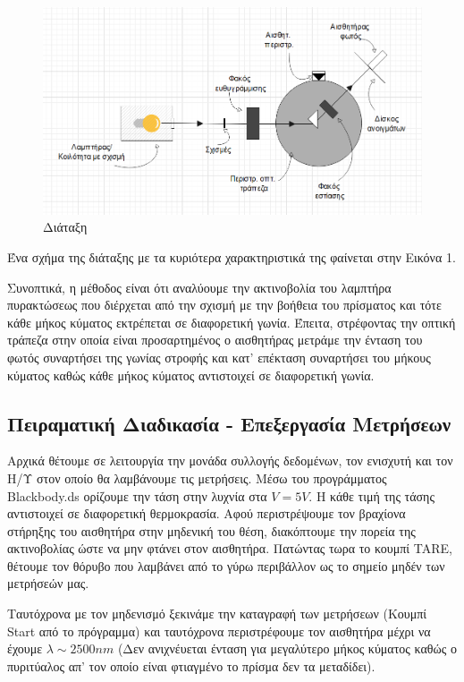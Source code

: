 \documentclass[a4paper]{article}
\begin{document}
\begin{figure}
\includegraphics[width=1.3\linewidth]{setup.png} 
\caption{Διάταξη}
\label{fig:wrapfig}
\end{figure}
	
Ένα σχήμα της διάταξης με τα κυριότερα χαρακτηριστικά της φαίνεται στην Εικόνα 1.

Συνοπτικά, η μέθοδος είναι ότι αναλύουμε την ακτινοβολία του λαμπτήρα πυρακτώσεως που διέρχεται από την σχισμή με την βοήθεια του πρίσματος και τότε κάθε μήκος κύματος εκτρέπεται σε διαφορετική γωνία. Έπειτα, στρέφοντας την οπτική τράπεζα στην οποία είναι προσαρτημένος ο αισθητήρας μετράμε  την ένταση του φωτός συναρτήσει της γωνίας στροφής και κατ' επέκταση συναρτήσει του μήκους κύματος καθώς κάθε μήκος κύματος αντιστοιχεί σε διαφορετική γωνία.


\subsection*{Πειραματική Διαδικασία - Επεξεργασία Μετρήσεων}
Αρχικά θέτουμε σε λειτουργία την μονάδα συλλογής δεδομένων, τον ενισχυτή και τον Η/Υ στον οποίο θα λαμβάνουμε τις μετρήσεις. Μέσω του προγράμματος Blackbody.ds ορίζουμε την τάση στην λυχνία στα $V=5V$. Η κάθε τιμή της τάσης αντιστοιχεί σε διαφορετική θερμοκρασία. Αφού περιστρέψουμε τον βραχίονα στήρηξης του αισθητήρα στην μηδενική του θέση, διακόπτουμε την πορεία της ακτινοβολίας ώστε να μην φτάνει στον αισθητήρα. Πατώντας τωρα το κουμπί TARE, θέτουμε τον θόρυβο που λαμβάνει από το γύρω περιβάλλον ως το σημείο μηδέν των μετρήσεών μας. 

Ταυτόχρονα με τον μηδενισμό ξεκινάμε την καταγραφή των μετρήσεων (Κουμπί Start από το πρόγραμμα) και ταυτόχρονα περιστρέφουμε τον αισθητήρα μέχρι να έχουμε $\lambda\sim2500nm$ (Δεν ανιχνέυεται ένταση για μεγαλύτερο μήκος κύματος καθώς ο πυριτύαλος απ' τον οποίο είναι φτιαγμένο το πρίσμα δεν τα μεταδίδει). 
\end{document}
